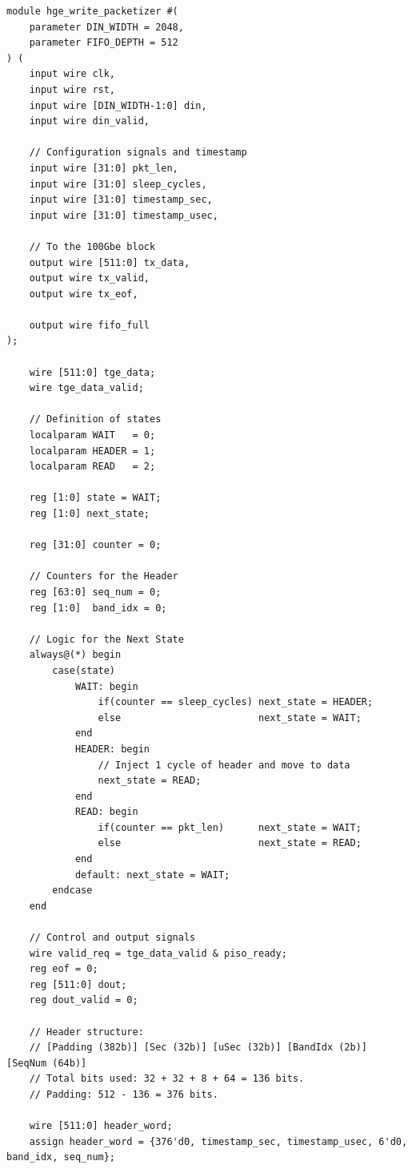 \begin{lstlisting}[style={prettyverilog}, caption={Verilog code for the HGE write packetizer used in \texttt{packetizer\_top.v}.}, label={lst:verilog_hge_packetizer}]
module hge_write_packetizer #(
    parameter DIN_WIDTH = 2048,
    parameter FIFO_DEPTH = 512
) (
    input wire clk,
    input wire rst,
    input wire [DIN_WIDTH-1:0] din,
    input wire din_valid,
    
    // Configuration signals and timestamp
    input wire [31:0] pkt_len,      
    input wire [31:0] sleep_cycles,
    input wire [31:0] timestamp_sec,  
    input wire [31:0] timestamp_usec, 

    // To the 100Gbe block 
    output wire [511:0] tx_data,
    output wire tx_valid,
    output wire tx_eof,

    output wire fifo_full
);

    wire [511:0] tge_data;
    wire tge_data_valid;

    // Definition of states
    localparam WAIT   = 0;
    localparam HEADER = 1; 
    localparam READ   = 2;
    
    reg [1:0] state = WAIT;
    reg [1:0] next_state;

    reg [31:0] counter = 0;
    
    // Counters for the Header
    reg [63:0] seq_num = 0;  
    reg [1:0]  band_idx = 0; 

    // Logic for the Next State
    always@(*) begin
        case(state)
            WAIT: begin
                if(counter == sleep_cycles) next_state = HEADER;
                else                        next_state = WAIT;
            end
            HEADER: begin
                // Inject 1 cycle of header and move to data
                next_state = READ; 
            end
            READ: begin
                if(counter == pkt_len)      next_state = WAIT;
                else                        next_state = READ;
            end
            default: next_state = WAIT;
        endcase
    end

    // Control and output signals
    wire valid_req = tge_data_valid & piso_ready;
    reg eof = 0;
    reg [511:0] dout;
    reg dout_valid = 0;

    // Header structure:
    // [Padding (382b)] [Sec (32b)] [uSec (32b)] [BandIdx (2b)] [SeqNum (64b)]
    // Total bits used: 32 + 32 + 8 + 64 = 136 bits.
    // Padding: 512 - 136 = 376 bits.
    
    wire [511:0] header_word;
    assign header_word = {376'd0, timestamp_sec, timestamp_usec, 6'd0, band_idx, seq_num};


\end{lstlisting}
